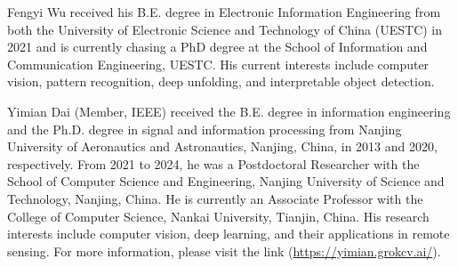 \documentclass[10pt,journal,compsoc]{IEEEtran}
\begin{document}

%
%
%



% 
% 


\begin{IEEEbiography}
{Fengyi Wu}
received his B.E. degree in Electronic Information Engineering from both the University of Electronic Science and Technology of China (UESTC) in 2021 and is currently chasing a PhD degree at the School of Information and Communication Engineering, UESTC. His current interests include computer vision, pattern recognition, deep unfolding, and interpretable object detection.
\end{IEEEbiography}

\begin{IEEEbiography}
{Yimian Dai}
(Member, IEEE) received the B.E. degree in information engineering and the Ph.D. degree in signal and information processing from Nanjing University of Aeronautics and Astronautics, Nanjing, China, in 2013 and 2020, respectively.
From 2021 to 2024, he was a Postdoctoral Researcher with the School of Computer Science and Engineering, Nanjing University of Science and Technology, Nanjing, China. 
He is currently an Associate Professor with the College of Computer Science, Nankai University, Tianjin, China.
His research interests include computer vision, deep learning, and their applications in remote sensing.
For more information, please visit the link (\href{https://yimian.grokcv.ai/}{https://yimian.grokcv.ai/}).
\end{IEEEbiography}
\end{document}
